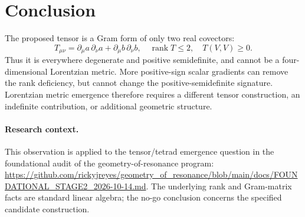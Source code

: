 \documentclass[11pt]{article}
\theoremstyle{remark}
\newcommand{\rank}{\operatorname{rank}}
\begin{document}
\section{Conclusion}
The proposed tensor is a Gram form of only two real covectors:
\begin{equation}\boxed{
 T_{\mu\nu}=\partial_\mu a\,\partial_\nu a
             +\partial_\mu b\,\partial_\nu b,
 \quad\rank T\leq2,\quad T(V,V)\geq0.
}\end{equation}
Thus it is everywhere degenerate and positive semidefinite, and
cannot be a four-dimensional Lorentzian metric.  More positive-sign
scalar gradients can remove the rank deficiency, but cannot change
the positive-semidefinite signature.  Lorentzian metric emergence
therefore requires a different tensor construction, an indefinite
contribution, or additional geometric structure.

\paragraph{Research context.}
This observation is applied to the tensor/tetrad emergence question
in the foundational audit of the geometry-of-resonance program:
\url{https://github.com/rickyjreyes/geometry_of_resonance/blob/main/docs/FOUNDATIONAL_STAGE2_2026-10-14.md}.
The underlying rank and Gram-matrix facts are standard linear algebra;
the no-go conclusion concerns the specified candidate construction.
\end{document}
